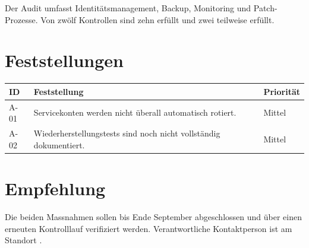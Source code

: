 \documentclass{coolreport}
\begin{document}
\reporttitlepage

\begin{reportsummary}
Der Audit umfasst Identitätsmanagement, Backup, Monitoring und Patch-Prozesse.
Von zwölf Kontrollen sind zehn erfüllt und zwei teilweise erfüllt.
\end{reportsummary}



\section{Feststellungen}

\begin{tabularx}{\textwidth}{@{}l X l@{}}
  \toprule
  ID & Feststellung & Priorität \\
  \midrule
  A-01 & Servicekonten werden nicht überall automatisch rotiert. & Mittel \\
  A-02 & Wiederherstellungstests sind noch nicht vollständig dokumentiert. & Mittel \\
  \bottomrule
\end{tabularx}

\section{Empfehlung}

Die beiden Massnahmen sollen bis Ende September abgeschlossen und über einen
erneuten Kontrolllauf verifiziert werden. Verantwortliche Kontaktperson ist
\customercontact{} am Standort \customerlocation.

\end{document}
